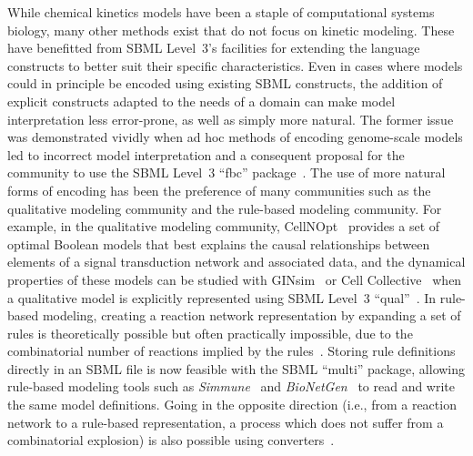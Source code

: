 \documentclass[]{draft-sbml-paper}
\begin{document}
While chemical kinetics models have been a staple of computational systems biology, many other methods exist that do not focus on kinetic modeling.  These have benefitted from SBML Level~3's facilities for extending the language constructs to better suit their specific characteristics.  Even in cases where models could in principle be encoded using existing SBML constructs, the addition of explicit constructs adapted to the needs of a domain can make model interpretation less error-prone, as well as simply more natural.  The former issue was demonstrated vividly when ad hoc methods of encoding genome-scale models led to incorrect model interpretation and a consequent proposal for the community to use the SBML Level~3 ``fbc'' package~\citep{Ebrahim2015}.  The use of more natural forms of encoding has been the preference of many communities such as the qualitative modeling community and the rule-based modeling community.  For example, in the qualitative modeling community, CellNOpt~\citep{terfve2012cellnoptr} provides a set of optimal Boolean models that best explains the causal relationships between elements of a signal transduction network and associated data, and the dynamical properties of these models can be studied with GINsim~\citep{chaouiya2012logical} or Cell Collective~\citep{helikar2012cell} when a qualitative model is explicitly represented using SBML Level~3 ``qual''~\citep{Chaouiya2015sbml}.  In rule-based modeling, creating a reaction network representation by expanding a set of rules is theoretically possible but often practically impossible, due to the combinatorial number of reactions implied by the rules~\citep{Hlavacek2003complexity}.  Storing rule definitions directly in an SBML file is now feasible with the SBML ``multi'' package, allowing rule-based modeling tools such as \emph{Simmune}~\citep{zhang2013simmune} and \emph{BioNetGen}~\citep{faeder2009rule, Harris2016bionetgen} to read and write the same model definitions.  Going in the opposite direction (i.e., from a reaction network to a rule-based representation, a process which does not suffer from a combinatorial explosion) is also possible using converters~\citep{Tapia2013atomizer}.
\end{document}
